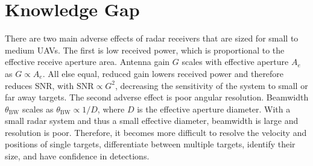 \section{Knowledge Gap}
There are two main adverse effects of radar receivers that are sized for small to medium UAVs. The first is low received power, which is proportional to the effective receive aperture area. Antenna gain \(G\) scales with effective aperture \(A_e\) as \(G \propto A_e\). All else equal, reduced gain lowers received power and therefore reduces SNR, with \(\mathrm{SNR} \propto G^2\), decreasing the sensitivity of the system to small or far away targets. The second adverse effect is poor angular resolution. Beamwidth \(\theta_{\mathrm{BW}}\) scales as \(\theta_{\mathrm{BW}} \propto 1/D\), where \(D\) is the effective aperture diameter. With a small radar system and thus a small effective diameter, beamwidth is large and resolution is poor. Therefore, it becomes more difficult to resolve the velocity and positions of single targets, differentiate between multiple targets, identify their size, and have confidence in detections. 

